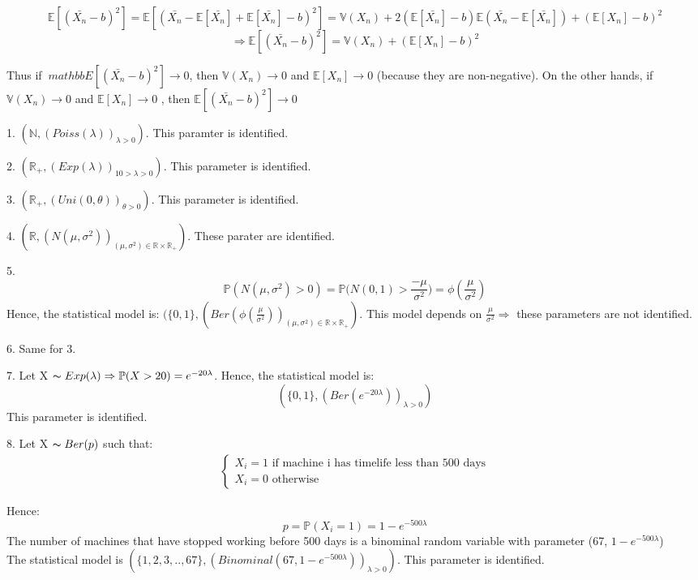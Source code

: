\documentclass[10pt]{article}
\newenvironment{problem}[2][Problem]{\begin{trivlist}
\item[\hskip \labelsep {\bfseries #1}\hskip \labelsep {\bfseries #2.}]}{\end{trivlist}}
\begin{document}
\begin{problem}{2}
\[\mathbb{E}[(\bar{X_n}-b)^2]=\mathbb{E}[(\bar{X_n}-\mathbb{E}[\bar{X_n}]+ \mathbb{E}[\bar{X_n}]-b)^2]=\mathbb{V}(X_n)+ 2(\mathbb{E}[\bar{X_n}]-b)\mathbb{E}(\bar{X_n}-\mathbb{E}[\bar{X_n}])+ (\mathbb{E}[X_n]-b)^2\]
\[\Rightarrow \mathbb{E}[(\bar{X_n}-b)^2]= \mathbb{V}(X_n)+(\mathbb{E}[X_n]-b)^2\]

Thus if $\ mathbb{E}[(\bar{X_n}-b)^2] \rightarrow 0 $, then $\mathbb{V}(X_n) \rightarrow 0 $ and $\mathbb{E}[X_n] \rightarrow 0 $ (because they are non-negative). On the other hands, if $\mathbb{V}(X_n) \rightarrow 0 $ and $\mathbb{E}[X_n] \rightarrow 0 $ , then $\mathbb{E}[(\bar{X_n}-b)^2] \rightarrow 0 $

\item 1.
$(\mathbb{N}, (Poiss(\lambda))_{\lambda>0})$. This paramter is identified.
\item 2.
$(\mathbb{R_+}, (Exp(\lambda))_{10>\lambda>0})$. This parameter is identified.
\item 3.
$(\mathbb{R_+}, (Uni(0, \theta))_{\theta >0})$. This parameter is identified.
\item 4.
$(\mathbb{R}, (N(\mu, \sigma^2))_{(\mu, \sigma^2) \in \mathbb{R} \times \mathbb{R_+}})$. These parater are identified.
\item 5.
\[\mathbb{P}(N(\mu, \sigma^2)>0)=\mathbb{P}\Big( N(0,1) > \frac{-\mu}{\sigma^2} \Big)=\phi(\frac{\mu}{\sigma^2})\]
Hence, the statistical model is: $(\{0,1\}, (Ber(\phi(\frac{\mu}{\sigma^2}))_{(\mu, \sigma^2) \in \mathbb{R} \times \mathbb{R_+}})$. This model depends on $\frac{\mu}{\sigma^2} \Rightarrow$ these parameters are not identified.
\item 6.
Same for 3.
\item 7.
Let X $\thicksim Exp(\lambda) \Rightarrow \mathbb{P}(X>20)=e^{-20\lambda}$. Hence, the statistical model is:
\[(\{ 0,1\},(Ber(e^{-20\lambda}))_{\lambda>0}) \] 
This parameter is identified.

\item 8.
Let X $\thicksim Ber(p)$ such that:
\begin{align}
    \begin{cases}
        X_{i}=1 \text{ if machine i has timelife less than 500 days} \\
        X_{i}=0 \text{ otherwise}
    \end{cases}
\end{align}

Hence: 
\[p=\mathbb{P}(X_{i}=1)=1-e^{-500\lambda}\]
The number of machines that have stopped working before 500 days is a binominal random variable with parameter (67, $1-e^{-500\lambda}$)\\
The statistical model is $(\{1,2,3,..,67 \}, (Binominal(67, 1-e^{-500\lambda}))_{\lambda>0})$. This parameter is identified.

\end{problem}
\end{document}
